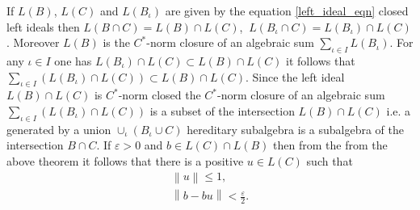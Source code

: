 \documentclass{beamer}
\theoremstyle{plain}
\newcommand{\bean}{\begin{eqnarray*}}
\newcommand{\eean}{\end{eqnarray*}}
\newcommand{\eps}{\varepsilon}                    %
\begin{document}
\begin{frame}
 If $L\left( B\right)$, $L\left( C\right)$ and $L\left( B_\iota \right)$ are given by the equation \eqref{left_ideal_eqn} closed left ideals then $L\left(B\cap C \right) = L(B)\cap L(C)$, $~L\left(B_\iota \cap C \right)= L\left(B_\iota \right)\cap L\left( C \right)$. Moreover $L\left(B\right)$ is the $C^*$-norm closure of an algebraic sum $\sum_{\iota\in I} L\left( B_\iota\right)$. For any $\iota \in I$ one has $L\left(B_\iota\right)\cap L\left(C\right)\subset L\left(B\right)\cap L\left(C\right)$ it follows that $\sum_{\iota\in I} \left( L\left(B_\iota\right)\cap L\left(C\right)\right) \subset L\left(B\right)\cap L\left(C\right)$. Since the left ideal  $L\left(B\right)\cap L\left(C\right)$ is $C^*$-norm closed the $C^*$-norm closure of an algebraic sum $\sum_{\iota\in I} \left( L\left(B_\iota\right)\cap L\left(C\right)\right)$ is a subset of  the intersection $L\left(B\right)\cap L\left(C\right)$ i.e. a generated by a union $\cup_\iota \left( B_\iota\cup C\right)$ hereditary subalgebra is a subalgebra of the intersection $B\cap C$.
 If $\eps > 0$ and $ b\in L\left(C\right)\cap L\left(B\right)$ then from the from the above theorem it follows that there is a positive $u \in L\left(C\right)$ such that 
 \bean
 \left\|u \right\| \le 1,\\
 \left\|b - b u\right\|< \frac{\eps}{2}.
 \eean 
\end{frame}
\end{document}
